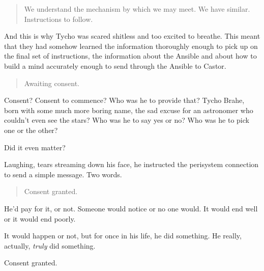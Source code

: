 \begin{quote}
We understand the mechanism by which we may meet. We have similar. Instructions to follow.
\end{quote}

\noindent And this is why Tycho was scared shitless and too excited to breathe. This meant that they had somehow learned the information thoroughly enough to pick up on the final set of instructions, the information about the Ansible and about how to build a mind accurately enough to send through the Ansible to Castor.

\begin{quote}
Awaiting consent.
\end{quote}

\noindent Consent? Consent to commence? Who was he to provide that? Tycho Brahe, born with some much more boring name, the sad excuse for an astronomer who couldn't even see the stars? Who was he to say yes or no? Who was he to pick one or the other?

Did it even matter?

Laughing, tears streaming down his face, he instructed the perisystem connection to send a simple message. Two words.

\begin{quote}
Consent granted.
\end{quote}

\noindent He'd pay for it, or not. Someone would notice or no one would. It would end well or it would end poorly.

It would happen or not, but for once in his life, he did something. He really, actually, \emph{truly} did something.

Consent granted.
